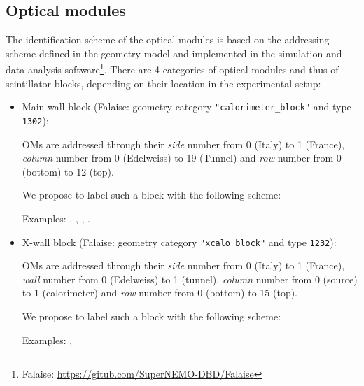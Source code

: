 \documentclass[12pt,a4paper]{article}
\begin{document}
\subsection{Optical modules}

The  identification scheme  of the  optical  modules is  based on  the
addressing scheme defined in the geometry model and implemented in the
simulation     and     data    analysis     software\footnote{Falaise:
  \url{https://gitub.com/SuperNEMO-DBD/Falaise}}.     There   are    4
categories  of  optical  modules  and  thus  of  scintillator  blocks,
depending on their location in the experimental setup:

\begin{itemize}
  
\item     Main    wall     block    (Falaise:     geometry    category
  \texttt{"calorimeter\_block"} and type \texttt{1302}):

  \par  OMs are  addressed  through  their
  \emph{side}   number from 0 (Italy)     to  1 (France),
  \emph{column} number from 0 (Edelweiss) to 19 (Tunnel) and
  \emph{row}    number from 0 (bottom)    to 12 (top).

  \par We  propose to label such a block with the following scheme:
  \begin{center}
  \end{center}
  \vskip 10pt
  \par\noindent Examples: , 
  , , .
  
\item X-wall block (Falaise: geometry category \texttt{"xcalo\_block"} and type
  \texttt{1232}):
  
  \par OMs  are addressed  through their
  \emph{side}   number from 0 (Italy)     to  1 (France),
  \emph{wall}   number from 0 (Edelweiss) to  1 (tunnel),
  \emph{column} number from 0 (source)    to  1 (calorimeter) and
  \emph{row}    number from 0 (bottom)    to 15 (top).
  
  \par  We propose  to
  label such a block with the following scheme:
  \begin{center}
  \end{center}
  \vskip 10pt
  \par\noindent Examples: , 
  

\end{itemize}
\end{document}

